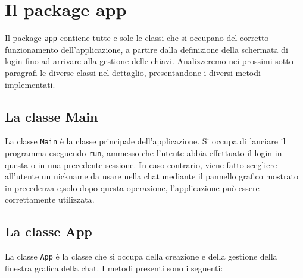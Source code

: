 \section{Il package app}
Il package \texttt{app} contiene tutte e sole le classi che si occupano del corretto
funzionamento dell'applicazione, a partire dalla definizione della schermata di login
fino ad arrivare alla gestione delle chiavi. Analizzeremo nei prossimi sotto-paragrafi
le diverse classi nel dettaglio, presentandone i diversi metodi implementati.

\subsection{La classe Main}
La classe \texttt{Main} è la classe principale dell'applicazione.
Si occupa di lanciare il programma eseguendo \texttt{run},
ammesso che l'utente abbia effettuato il login in questa
o in una precedente sessione.
In caso contrario, viene fatto scegliere all'utente un nickname da usare nella chat
mediante il pannello grafico mostrato in precedenza e,solo dopo questa operazione,
l'applicazione può essere correttamente utilizzata.

\subsection{La classe App}
La classe \texttt{App} è la classe che si occupa della creazione e della gestione della
finestra grafica della chat. I metodi presenti sono i seguenti: